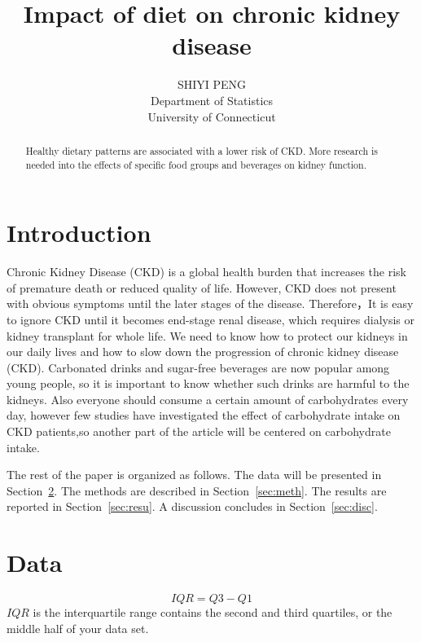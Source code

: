 \documentclass[12pt]{article}
\title{Impact of diet on chronic kidney disease}
\author{SHIYI PENG\\
  Department of Statistics\\
  University of Connecticut
}
\begin{document}
\maketitle

\begin{abstract}

\citet{Van2020Diet}Healthy dietary patterns are associated with a lower risk of CKD. More research is needed into the effects of specific food groups and beverages on kidney function.\lipsum[1]

\end{abstract}


\section{Introduction}
\label{sec:intro}

Chronic Kidney Disease (CKD) is a global health burden that increases the risk of premature death or reduced quality of life. However, CKD does not present with obvious symptoms until the later stages of the disease. Therefore，It is easy to ignore CKD until it becomes end-stage renal disease, which requires dialysis or kidney transplant for whole life\citet{Hill2016Global}. We need to know how to protect our kidneys in our daily lives and how to slow down the progression of chronic kidney disease (CKD). Carbonated drinks and sugar-free beverages are now popular among young people, so it is important to know whether such drinks are harmful to the kidneys. Also everyone should consume a certain amount of carbohydrates every day, however few studies have investigated the effect of carbohydrate intake on CKD patients\citet{Ren2023Associations},so another part of the article will be centered on carbohydrate intake.

The rest of the paper is organized as follows.
The data will be presented in Section~\ref{sec:data}.
The methods are described in Section~\ref{sec:meth}.
The results are reported in Section~\ref{sec:resu}.
A discussion concludes in Section~\ref{sec:disc}.


\section{Data}
\label{sec:data}
\begin{equation}
  IQR=Q3-Q1
\end{equation}
$IQR$ is the interquartile range contains the second and third quartiles, or the middle half of your data set. 
\end{document}
